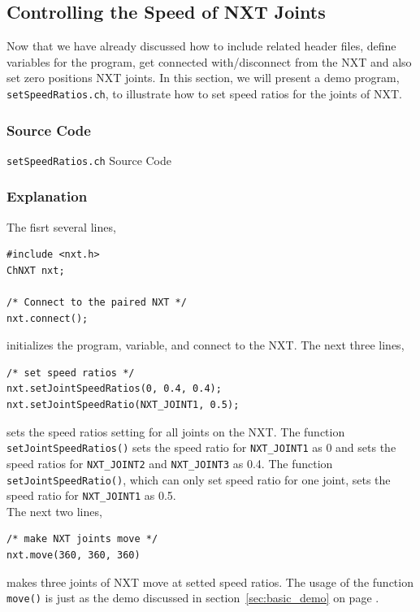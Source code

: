 \documentclass[11pt]{article}
\begin{document}
\subsection{\label{sec:speed_demo}Controlling the Speed of NXT Joints}
Now that we have already discussed how to include related header files, define variables for the program, 
get connected with/disconnect from the NXT and also set zero positions NXT joints. In this section, we will 
present a demo program, \texttt{setSpeedRatios.ch}, to illustrate how to set speed ratios for the joints of NXT.

\subsubsection*{Source Code}
\begin{Program}[H]
    {\small}
    \caption{\texttt{setSpeedRatios.ch} Source Code\label{prog_setSpeedRatios.ch}}
\end{Program}

\subsubsection*{Explanation}
The fisrt several lines,
\begin{verbatim}
#include <nxt.h>
ChNXT nxt;

/* Connect to the paired NXT */
nxt.connect();
\end{verbatim}
initializes the program, variable, and connect to the NXT. The next three lines,
\begin{verbatim}
/* set speed ratios */
nxt.setJointSpeedRatios(0, 0.4, 0.4);
nxt.setJointSpeedRatio(NXT_JOINT1, 0.5);
\end{verbatim}
sets the speed ratios setting for all joints on the NXT. The function \texttt{setJointSpeedRatios()} sets 
the speed ratio for \texttt{NXT\_JOINT1} as 0 and sets the speed ratios for \texttt{NXT\_JOINT2} and 
\texttt{NXT\_JOINT3} as 0.4. The function \texttt{setJointSpeedRatio()}, which can only set speed ratio
for one joint, sets the speed ratio for \texttt{NXT\_JOINT1} as 0.5.\\

\noindent
The next two lines,
\begin{verbatim}
/* make NXT joints move */
nxt.move(360, 360, 360)
\end{verbatim}
makes three joints of NXT move at setted speed ratios. The usage of the function \texttt{move()} is just 
as the demo discussed in section~\ref{sec:basic_demo} on page \pageref{sec:basic_demo}.\\
\end{document}
